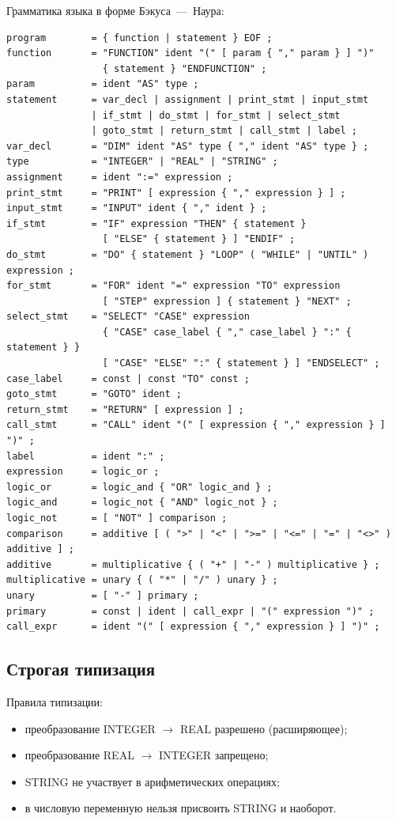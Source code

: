 \documentclass[14pt,a4paper]{article}
\begin{document}
Грамматика языка в форме Бэкуса~---~Наура:
\begin{verbatim}
program        = { function | statement } EOF ;
function       = "FUNCTION" ident "(" [ param { "," param } ] ")"
                 { statement } "ENDFUNCTION" ;
param          = ident "AS" type ;
statement      = var_decl | assignment | print_stmt | input_stmt
               | if_stmt | do_stmt | for_stmt | select_stmt
               | goto_stmt | return_stmt | call_stmt | label ;
var_decl       = "DIM" ident "AS" type { "," ident "AS" type } ;
type           = "INTEGER" | "REAL" | "STRING" ;
assignment     = ident ":=" expression ;
print_stmt     = "PRINT" [ expression { "," expression } ] ;
input_stmt     = "INPUT" ident { "," ident } ;
if_stmt        = "IF" expression "THEN" { statement }
                 [ "ELSE" { statement } ] "ENDIF" ;
do_stmt        = "DO" { statement } "LOOP" ( "WHILE" | "UNTIL" ) expression ;
for_stmt       = "FOR" ident "=" expression "TO" expression
                 [ "STEP" expression ] { statement } "NEXT" ;
select_stmt    = "SELECT" "CASE" expression
                 { "CASE" case_label { "," case_label } ":" { statement } }
                 [ "CASE" "ELSE" ":" { statement } ] "ENDSELECT" ;
case_label     = const | const "TO" const ;
goto_stmt      = "GOTO" ident ;
return_stmt    = "RETURN" [ expression ] ;
call_stmt      = "CALL" ident "(" [ expression { "," expression } ] ")" ;
label          = ident ":" ;
expression     = logic_or ;
logic_or       = logic_and { "OR" logic_and } ;
logic_and      = logic_not { "AND" logic_not } ;
logic_not      = [ "NOT" ] comparison ;
comparison     = additive [ ( ">" | "<" | ">=" | "<=" | "=" | "<>" ) additive ] ;
additive       = multiplicative { ( "+" | "-" ) multiplicative } ;
multiplicative = unary { ( "*" | "/" ) unary } ;
unary          = [ "-" ] primary ;
primary        = const | ident | call_expr | "(" expression ")" ;
call_expr      = ident "(" [ expression { "," expression } ] ")" ;
\end{verbatim}

\subsection{Строгая типизация}

Правила типизации:
\begin{itemize}
  \item преобразование INTEGER $\to$ REAL разрешено (расширяющее);
  \item преобразование REAL $\to$ INTEGER запрещено;
  \item STRING не участвует в арифметических операциях;
  \item в числовую переменную нельзя присвоить STRING и наоборот.
\end{itemize}
\end{document}
